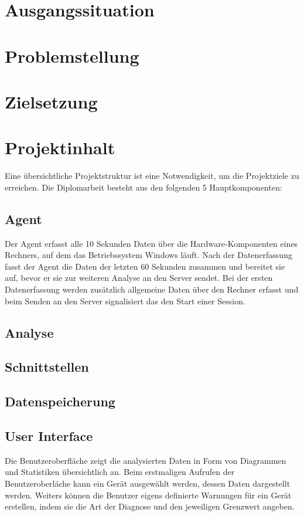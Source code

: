 \documentclass{report}
\begin{document}
\section{Ausgangssituation}
\section{Problemstellung}
\section{Zielsetzung}
\section{Projektinhalt}
Eine übersichtliche Projektstruktur ist eine Notwendigkeit, um die Projektziele zu erreichen. Die Diplomarbeit besteht aus den folgenden 5 Hauptkomponenten:
\subsection{Agent}
Der Agent erfasst alle 10 Sekunden Daten über die Hardware-Komponenten eines Rechners, auf dem das Betriebssystem Windows läuft. Nach der Datenerfassung fasst der Agent die Daten der letzten 60 Sekunden zusammen und bereitet sie auf, bevor er sie zur weiteren Analyse an den Server sendet. Bei der ersten Datenerfassung werden zusätzlich allgemeine Daten über den Rechner erfasst und beim Senden an den Server signalisiert das den Start einer Session.
\subsection{Analyse}
\subsection{Schnittstellen}
\subsection{Datenspeicherung}
\subsection{User Interface}
Die Benutzeroberfläche zeigt die analysierten Daten in Form von Diagrammen und Statistiken übersichtlich an. Beim erstmaligen Aufrufen der Benutzeroberläche kann ein Gerät ausgewählt werden, dessen Daten dargestellt werden. Weiters können die Benutzer eigens definierte Warnungen für ein Gerät erstellen, indem sie die Art der Diagnose und den jeweiligen Grenzwert angeben.
\end{document}
